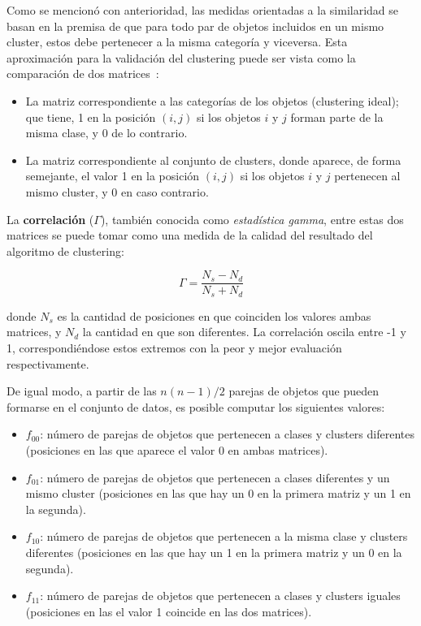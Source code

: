 Como se mencionó con anterioridad, las medidas orientadas a la similaridad se basan en la premisa de que para todo par de objetos incluidos en un mismo cluster, estos debe pertenecer a la misma categoría y viceversa.
Esta aproximación para la validación del clustering puede ser vista como la comparación de dos matrices~\cite{Tan05}:

\begin{itemize}
    \item La matriz correspondiente a las categorías de los objetos (clustering ideal);
    que tiene, 1 en la posición $(i, j)$ si los objetos $i$ y $j$ forman parte de la misma clase, y 0 de lo contrario.
    \item La matriz correspondiente al conjunto de clusters, donde aparece, de forma semejante, el valor 1 en la posición $(i,j)$ si los objetos $i$ y $j$ pertenecen al mismo cluster, y 0 en caso contrario.
\end{itemize}

La \textbf{correlación} ($\Gamma$), también conocida como \textit{estadística gamma}, entre estas dos matrices se puede tomar como una medida de la calidad del resultado del algoritmo de clustering:

\begin{equation}
    \label{eq:gamma-statistic}
    \Gamma = \frac{N_s - N_d}{N_s + N_d}
\end{equation}

\noindent
donde $N_s$ es la cantidad de posiciones en que coinciden los valores ambas matrices, y $N_d$ la cantidad en que son diferentes.
La correlación oscila entre -1 y 1, correspondiéndose estos extremos con la peor y mejor evaluación respectivamente.

De igual modo, a partir de las $n(n-1)/2$ parejas de objetos que pueden formarse en el conjunto de datos, es posible computar los siguientes valores:

\begin{itemize}
    \item $f_{00}$: número de parejas de objetos que pertenecen a clases y clusters diferentes (posiciones en las que aparece el valor 0 en ambas matrices).
    \item $f_{01}$: número de parejas de objetos que pertenecen a clases diferentes y un mismo cluster (posiciones en las que hay un 0 en la primera matriz y un 1 en la segunda).
    \item $f_{10}$: número de parejas de objetos que pertenecen a la misma clase y clusters diferentes (posiciones en las que hay un 1 en la primera matriz y un 0 en la segunda).
    \item $f_{11}$: número de parejas de objetos que pertenecen a clases y clusters iguales (posiciones en las el valor 1 coincide en las dos matrices).
\end{itemize}

